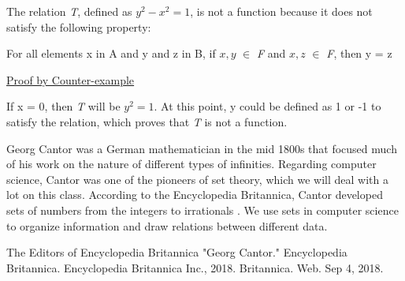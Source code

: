 \documentclass{article}
\begin{document}
\clearpage
\header
The relation \emph{T}, defined as $y^{2}-x^{2}=1$, is not a function because it does not satisfy the following property:
\begin{center}
	For all elements x in A and y and z in B, if  \(x,y\) $\in$ \emph{F} and \(x,z\) $\in$ \emph{F}, then y = z
	
	\underline{Proof by Counter-example}
\end{center}
If x = 0, then \emph{T} will be $y^{2} = 1$. At this point, y could be defined as 1 or -1 to satisfy the relation, which proves that \emph{T} is not a function.

\clearpage
\header
Georg Cantor was a German mathematician in the mid 1800s that focused much of his work on the nature of different types of infinities. Regarding computer science, Cantor was one of the pioneers of set theory, which we will deal with a lot on this class. According to the Encyclopedia Britannica, Cantor developed sets of numbers from the integers to irrationals \cite{Britinnica}. We use sets in computer science to organize information and draw relations between different data.

\newpage
\begin{thebibliography}{9}
	 The Editors of Encyclopedia Britannica "Georg Cantor." Encyclopedia Britannica. Encyclopedia Britannica Inc., 2018. Britannica. Web. Sep 4, 2018.
\end{thebibliography}
\end{document}
